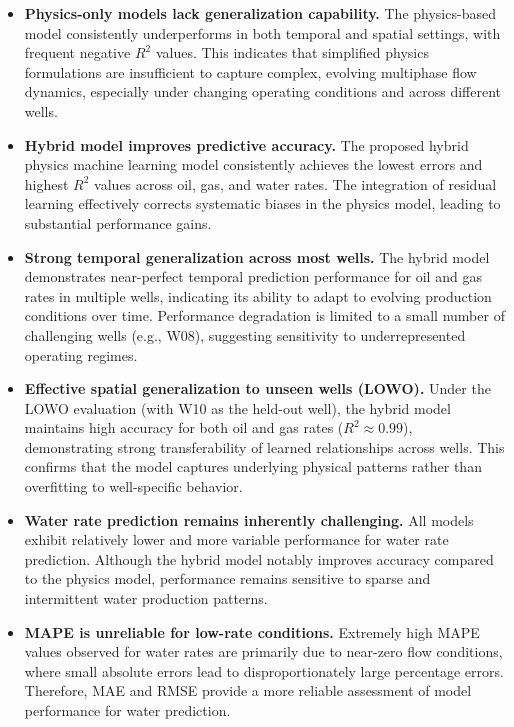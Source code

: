 \documentclass[12pt,APA]{uomthesis}
\begin{document}
\begin{itemize}

\item \textbf{Physics-only models lack generalization capability.}  
The physics-based model consistently underperforms in both temporal and spatial settings, with frequent negative $R^2$ values. This indicates that simplified physics formulations are insufficient to capture complex, evolving multiphase flow dynamics, especially under changing operating conditions and across different wells.

\item \textbf{Hybrid model improves predictive accuracy.}  
The proposed hybrid physics machine learning model consistently achieves the lowest errors and highest $R^2$ values across oil, gas, and water rates. The integration of residual learning effectively corrects systematic biases in the physics model, leading to substantial performance gains.

\item \textbf{Strong temporal generalization across most wells.}  
The hybrid model demonstrates near-perfect temporal prediction performance for oil and gas rates in multiple wells, indicating its ability to adapt to evolving production conditions over time. Performance degradation is limited to a small number of challenging wells (e.g., W08), suggesting sensitivity to underrepresented operating regimes.

\item \textbf{Effective spatial generalization to unseen wells (LOWO).}  
Under the LOWO evaluation (with W10 as the held-out well), the hybrid model maintains high accuracy for both oil and gas rates ($R^2 \approx 0.99$), demonstrating strong transferability of learned relationships across wells. This confirms that the model captures underlying physical patterns rather than overfitting to well-specific behavior.

\item \textbf{Water rate prediction remains inherently challenging.}  
All models exhibit relatively lower and more variable performance for water rate prediction. Although the hybrid model notably improves accuracy compared to the physics model, performance remains sensitive to sparse and intermittent water production patterns.

\item \textbf{MAPE is unreliable for low-rate conditions.}  
Extremely high MAPE values observed for water rates are primarily due to near-zero flow conditions, where small absolute errors lead to disproportionately large percentage errors. Therefore, MAE and RMSE provide a more reliable assessment of model performance for water prediction.


\end{itemize}
\end{document}
